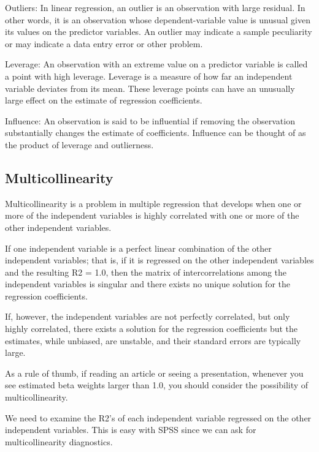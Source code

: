  

Outliers: In linear regression, an outlier is an observation with large residual. In other words, it is an observation whose dependent-variable value is unusual given its values on the predictor variables. An outlier may indicate a sample peculiarity or may indicate a data entry error or other problem.

 

Leverage: An observation with an extreme value on a predictor variable is called a point with high leverage. Leverage is a measure of how far an independent variable deviates from its mean. These leverage points can have an unusually large effect on the estimate of regression coefficients.

 

Influence: An observation is said to be influential if removing the observation substantially changes the estimate of coefficients. Influence can be thought of as the product of leverage and outlierness.

\subsection*{Multicollinearity} 

Multicollinearity is a problem in multiple regression that develops when one or more of the independent variables is highly correlated with one or more of the other independent variables. 


If one independent variable is a perfect linear combination of the other independent variables; that is, if it is regressed on the other independent variables and the resulting R2 = 1.0, then the matrix of intercorrelations among the independent variables is singular and there exists no unique solution for the regression coefficients.


If, however, the independent variables are not perfectly correlated, but only highly correlated, there exists a solution for the regression coefficients but the estimates, while unbiased, are unstable, and their standard errors are typically large. 


As a rule of thumb, if reading an article or seeing a presentation, whenever you see estimated beta weights larger than 1.0, you should consider the possibility of multicollinearity.


We need to examine the R2's of each independent variable regressed on the other independent variables. This is easy with SPSS since we can ask for multicollinearity diagnostics. 

